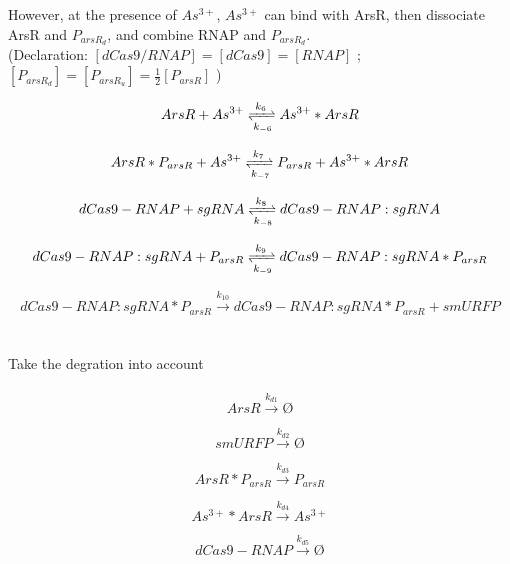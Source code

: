 However, at the presence of $As^{3+}$, $As^{3+}$ can bind with ArsR, then dissociate ArsR and $P_{arsR_d}$, and combine RNAP and $P_{arsR_d}$. \\

(Declaration: $[dCas9/RNAP] = [dCas9] = [RNAP]$ ; $[P_{arsR_d}] = [P_{arsR_u}] = \frac{1}{2}[P_{arsR}]$ )

\begin{equation}
ArsR +As^{3+}\xrightleftharpoons[k_{-6}]{k_6}As^{3+}*ArsR
\end{equation}

\begin{equation}
ArsR*P_{arsR} +As^{3+}\xrightleftharpoons[k_{-7}]{k_7}P_{arsR}+ As^{3+}*ArsR
\end{equation}

\begin{equation}
dCas9-RNAP+sgRNA\xrightleftharpoons[k_{-8}]{k_8} dCas9-RNAP:sgRNA
\end{equation}

\begin{equation}
dCas9-RNAP:sgRNA+P_{arsR}\xrightleftharpoons[k_{-9}]{k_9} dCas9-RNAP:sgRNA*P_{arsR}
\end{equation}

\begin{equation}
dCas9-RNAP:sgRNA*P_{arsR}\stackrel{k_{10}}{\longrightarrow} dCas9-RNAP:sgRNA*P_{arsR}+smURFP
\end{equation}
\\\\
Take the degration into account
\\\\
\begin{equation}
ArsR\stackrel{k_{d1}}{\longrightarrow}Ø
\end{equation}

\begin{equation}
smURFP\stackrel{k_{d2}}{\longrightarrow}Ø
\end{equation}


\begin{equation}
ArsR*P_{arsR}\stackrel{k_{d3}}{\longrightarrow}P_{arsR}
\end{equation}

\begin{equation}
As^{3+}*ArsR\stackrel{k_{d4}}{\longrightarrow}As^{3+}
\end{equation}

\begin{equation}
dCas9-RNAP\stackrel{k_{d5}}{\longrightarrow}Ø
\end{equation}

